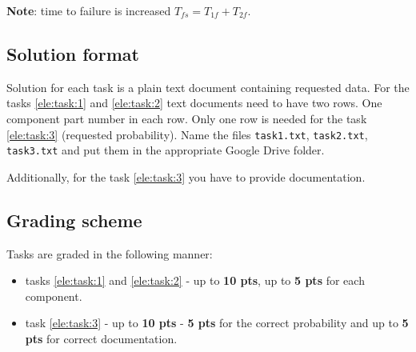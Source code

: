 \documentclass[a4paper]{article}
\begin{document}
\textbf{Note}: time to failure is increased $T_{fs} = T_{1f} + T_{2f}$. 

\subsection{Solution format}
Solution for each task is a plain text document containing requested data. For
the tasks \ref{ele:task:1} and \ref{ele:task:2} text documents need to have 
two rows. One component part number in each row. Only one row is needed for the 
task \ref{ele:task:3} (requested probability). Name the files 
\texttt{task1.txt}, \texttt{task2.txt}, \texttt{task3.txt} and put them in 
the appropriate Google Drive folder.

Additionally, for the task \ref{ele:task:3} you have to provide documentation.

\subsection{Grading scheme}
Tasks are graded in the following manner:
\begin{itemize}
\item tasks \ref{ele:task:1} and \ref{ele:task:2} - up to \textbf{10 pts}, 
up to \textbf{5 pts} for each component.
\item task \ref{ele:task:3} - up to \textbf{10 pts} - \textbf{5 pts} for the 
correct probability and up to \textbf{5 pts} for correct documentation.
\end{itemize}



 
\end{document}
